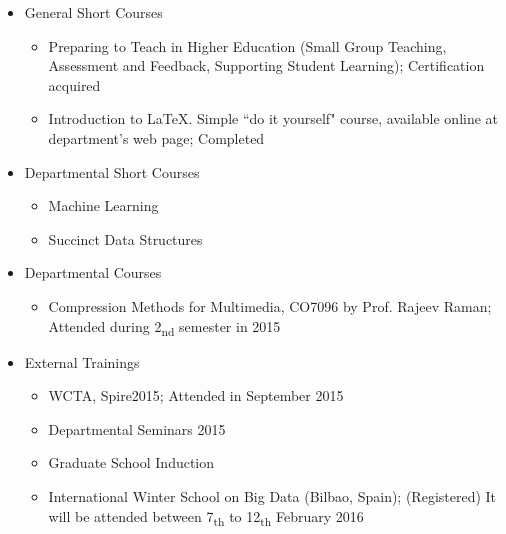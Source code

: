 \begin{itemize}
   \item  General Short Courses
   \begin{itemize}
     \item  Preparing to Teach in Higher Education (Small Group Teaching, Assessment and Feedback, Supporting Student Learning); Certification acquired
   \end{itemize}
   \begin{itemize}
     \item Introduction to LaTeX. Simple ``do it yourself" course, available online at department’s web page; Completed
   \end{itemize}
   \item Departmental Short Courses
   \begin{itemize}
     \item Machine Learning
   \end{itemize}  
   \begin{itemize}
     \item Succinct Data Structures
   \end{itemize}
   \item Departmental Courses
   \begin{itemize}
     \item Compression Methods for Multimedia, CO7096 by Prof. Rajeev Raman; Attended during 2\textsubscript{nd} semester in 2015
   \end{itemize}
   \item External Trainings
   \begin{itemize}
     \item WCTA, Spire2015; Attended in September 2015
   \end{itemize}
   \begin{itemize}
     \item Departmental Seminars 2015
   \end{itemize}
   \begin{itemize}
     \item Graduate School Induction
   \end{itemize}
   \begin{itemize}
     \item International Winter School on Big Data (Bilbao, Spain); (Registered) It will be attended between 7\textsubscript{th} to 12\textsubscript{th} February 2016
   \end{itemize}
 \end{itemize}
 
